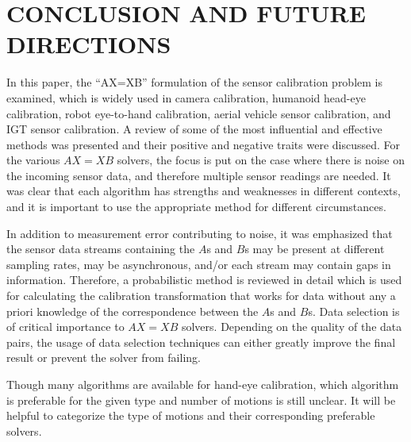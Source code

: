 \documentclass[twocolumn,10pt]{asme2ej}
\begin{document}
\section{CONCLUSION AND FUTURE DIRECTIONS}
\label{sec:conclusion}
In this paper, the ``AX=XB'' formulation of the sensor calibration problem is examined, which is widely used in camera calibration, humanoid head-eye calibration, robot eye-to-hand calibration, aerial vehicle sensor calibration, and IGT sensor calibration. A review of some of the most influential and effective methods was presented and their positive and negative traits were discussed. For the various $AX=XB$ solvers, the focus is put on the case where there is noise on the incoming sensor data, and therefore multiple sensor readings are needed. It was clear that each algorithm has strengths and weaknesses in different contexts, and it is important to use the appropriate method for different circumstances. %

In addition to measurement error contributing to noise, it was emphasized that the sensor data streams containing the $A$s and $B$s may be present at different sampling rates, may be asynchronous, and/or each stream may contain gaps in information. Therefore, a probabilistic method is reviewed in detail which is used for calculating the calibration transformation that works for data without any a priori knowledge of the correspondence between the $A$s and $B$s. Data selection is of critical importance to $AX=XB$ solvers. Depending on the quality of the data pairs, the usage of data selection techniques can either greatly improve the final result or prevent the solver from failing. 

Though many algorithms are available for hand-eye calibration, which algorithm is preferable for the given type and number of motions is still unclear. It will be helpful to categorize the type of motions and their corresponding preferable solvers.  

\end{document}
